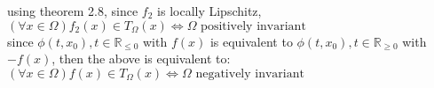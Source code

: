 \documentclass[12pt,letter]{article}
\newcommand{\R}{\mathbb{R}}
\begin{document}
\begin{itemize}
\begin{itemize}
      using theorem 2.8, since $f_2$ is locally Lipschitz,\\
      $(\forall x \in \Omega)  f_2(x) \in T_{\Omega}(x) \iff \Omega \text{ positively invariant}$\\

      since $\phi(t,x_0), t \in \R_{\leq 0}$ with $f(x)$ is equivalent to $\phi(t,x_0), t \in \R_{\geq 0}$ with $-f(x)$, then the above is equivalent to:\\
      $(\forall x \in \Omega)  f(x) \in T_{\Omega}(x) \iff \Omega \text{ negatively invariant}$\\
      



      
      

\end{itemize}
\end{itemize}
\end{document}

